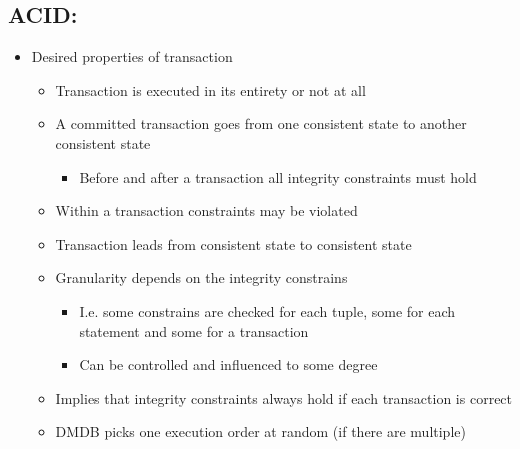 \subsection{ACID:}
\begin{itemize}
    \item Desired properties of transaction
        \begin{itemize}
            \item Transaction is executed in its entirety or not at all
        \end{itemize}
        \begin{itemize}
            \item A committed transaction goes from one consistent state to another consistent state
                \begin{itemize}
                    \item Before and after a transaction all integrity constraints must hold
                \end{itemize}
            \item Within a transaction constraints may be violated
            \item Transaction leads from consistent state to consistent state
            \item Granularity depends on the integrity constrains
                \begin{itemize}
                    \item I.e. some constrains are checked for each tuple, some for each statement and some for a transaction
                    \item Can be controlled and influenced to some degree
                \end{itemize}
        \end{itemize}
        \begin{itemize}
             Transaction executes as if it were alone in the system
                \begin{itemize}
                    \item I.e. enforce serializability
                    \item Much to hard to enforce
                \end{itemize}
            \item Implies that integrity constraints always hold if each transaction is correct
            \item DMDB picks one execution order at random (if there are multiple)

\end{itemize}
\end{itemize}
